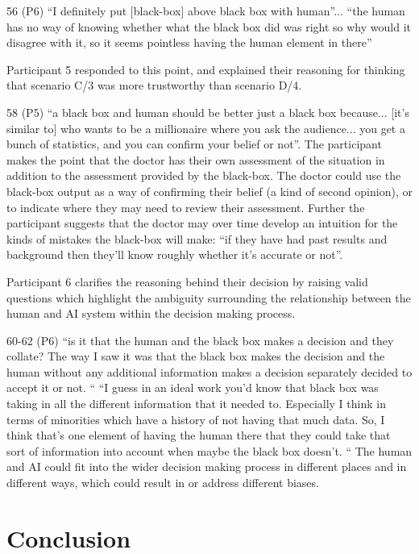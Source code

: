 \documentclass[manuscript,screen,review]{acmart}
\begin{document}
56 (P6) “I definitely put [black-box] above black box with human”... 
“the human has no way of knowing whether what the black box did was right so why would it disagree with it, so it seems pointless having the human element in there”

Participant 5 responded to this point, and explained their reasoning for thinking that scenario C/3 was more trustworthy than scenario D/4. 

58 (P5) “a black box and human should be better just a black box because... [it's similar to] who wants to be a millionaire where you ask the audience... you get a bunch of statistics, and you can confirm your belief or not”. 
The participant makes the point that the doctor has their own assessment of the situation in addition to the assessment provided by the black-box.
The doctor could use the black-box output as a way of confirming their belief (a kind of second opinion), or to indicate where they may need to review their assessment. Further the participant suggests that the doctor may over time develop an intuition for the kinds of mistakes the black-box will make:
“if they have had past results and background then they’ll know roughly whether it’s accurate or not”.

Participant 6 clarifies the reasoning behind their decision by raising valid questions which highlight the ambiguity surrounding the relationship between the  human and AI system within the decision making process.

60-62 (P6)
“is it that the human and the black box makes a decision and they collate? The way I saw it was that the black box makes the decision and the human without any additional information makes a decision separately decided to accept it or not. “
“I guess in an ideal work you'd know that black box was taking in all the different information that it needed to. Especially I think in terms of minorities which have a history of not having that much data. So, I think that’s one element of having the human there that they could take that sort of information into account when maybe the black box doesn’t. “
The human and AI could fit into the wider decision making process in different places and in different ways, which could result in or address different biases. 




\section{Conclusion}
\end{document}
